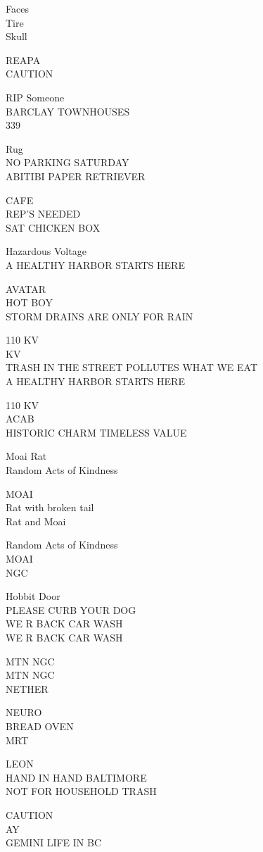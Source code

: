 \documentclass[10pt,letterpaper]{article}
\begin{document}
Faces\\
Tire\\
Skull

REAPA\\
CAUTION

RIP Someone\\
BARCLAY TOWNHOUSES\\
339

Rug\\
NO PARKING SATURDAY\\
ABITIBI PAPER RETRIEVER

CAFE\\
REP'S NEEDED\\
SAT CHICKEN BOX

Hazardous Voltage\\
A HEALTHY HARBOR STARTS HERE

AVATAR\\
HOT BOY\\
STORM DRAINS ARE ONLY FOR RAIN

110 KV\\
KV\\
TRASH IN THE STREET POLLUTES WHAT WE EAT\\
A HEALTHY HARBOR STARTS HERE

110 KV\\
ACAB\\
HISTORIC CHARM TIMELESS VALUE

Moai Rat\\
Random Acts of Kindness

MOAI\\
Rat with broken tail\\
Rat and Moai

Random Acts of Kindness\\
MOAI\\
NGC

Hobbit Door\\
PLEASE CURB YOUR DOG\\
WE R BACK CAR WASH\\
WE R BACK CAR WASH

MTN NGC\\
MTN NGC\\
NETHER

NEURO\\
BREAD OVEN\\
MRT

LEON\\
HAND IN HAND BALTIMORE\\
NOT FOR HOUSEHOLD TRASH

CAUTION\\
AY\\
GEMINI LIFE IN BC
\end{document}

